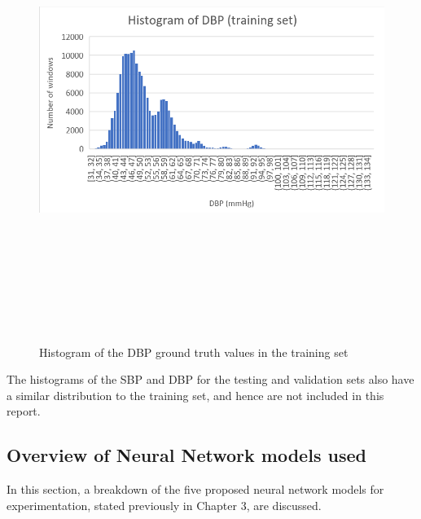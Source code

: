 \begin{figure}[H]
    \centering
    \includegraphics[width=15cm,height=15cm,keepaspectratio]{Implementation/trainingDbp.png}
    \caption{Histogram of the DBP ground truth values in the training set}
    \label{histDBP}
\end{figure}\noindent The histograms of the SBP and DBP for the testing and validation 
sets also have a similar distribution to the training set, and hence are not included in this report.

\subsection{Overview of Neural Network models used}
In this section, a breakdown of the five proposed neural network models for experimentation, stated previously in Chapter 3, are discussed.
